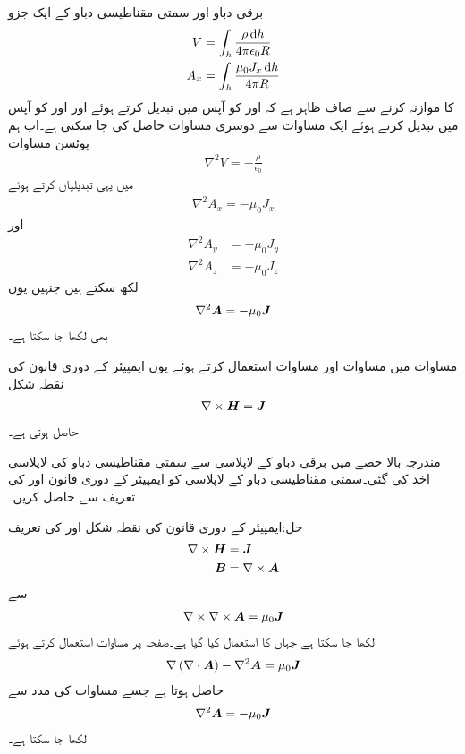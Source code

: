 برقی دباو اور سمتی مقناطیسی دباو کے ایک جزو
\begin{align*}
V&=\int_h \frac{\rho \dif h}{4\pi \epsilon_0 R}\\
A_x&=\int_h \frac{\mu_0 J_x \dif h}{4\pi R}
\end{align*}
 کا موازنہ کرنے سے صاف ظاہر ہے کہ  اور  کو آپس میں تبدیل کرتے ہوئے اور  اور  کو آپس میں تبدیل کرتے ہوئے ایک مساوات سے دوسری مساوات حاصل کی جا سکتی ہے۔اب ہم پوئسن  مساوات
\begin{align*}
\nabla^2 V=-\frac{\rho}{\epsilon_0}
\end{align*} 
میں یہی تبدیلیاں کرتے ہوئے
\begin{align*}
\nabla^2 A_x=-\mu_0 J_x
\end{align*}
اور
\begin{align*}
\nabla^2 A_y&=-\mu_0 J_y\\
\nabla^2 A_z&=-\mu_0 J_z
\end{align*}
لکھ سکتے ہیں جنہیں یوں
\begin{align}\label{مساوات_مقناطیسی_سمتی_مقناطیسی_دباو_کی_لاپلاسی}
\nabla^2 {{\boldsymbol{A}}}=-\mu_0 {{\boldsymbol{J}}}
\end{align}
 بھی لکھا جا سکتا ہے۔

مساوات  میں مساوات  اور مساوات  استعمال کرتے ہوئے یوں ایمپیئر کے دوری قانون کی نقطہ شکل 
\begin{align}
\nabla \times {\ensuremath{{\boldsymbol{H}}}}={{\boldsymbol{J}}}
\end{align}
حاصل ہوتی ہے۔

مندرجہ بالا حصے میں برقی دباو کے لاپلاسی سے سمتی مقناطیسی  دباو کی لاپلاسی اخذ کی گئی۔سمتی مقناطیسی دباو کے لاپلاسی کو ایمپیئر کے دوری قانون اور  کی تعریف سے حاصل کریں۔

حل:ایمپیئر کے دوری قانون کی نقطہ شکل اور  کی تعریف
\begin{align*}
\nabla \times {\ensuremath{{\boldsymbol{H}}}}&={{\boldsymbol{J}}}\\
{{\boldsymbol{B}}}&=\nabla \times {\ensuremath{{\boldsymbol{A}}}}
\end{align*}
سے
\begin{align*}
\nabla \times \nabla \times {\ensuremath{{\boldsymbol{A}}}}=\mu_0 {{\boldsymbol{J}}}
\end{align*}
لکھا جا سکتا ہے جہاں  کا استعمال کیا گیا ہے۔صفحہ  پر مساوات  استعمال کرتے ہوئے
\begin{align*}
\nabla \left(\nabla \cdot {\ensuremath{{\boldsymbol{A}}}} \right)-\nabla^2 {{\boldsymbol{A}}}=\mu_0 {{\boldsymbol{J}}}
\end{align*}
حاصل ہوتا ہے جسے مساوات  کی مدد سے
\begin{align}
\nabla^2 {{\boldsymbol{A}}}=-\mu_0 {{\boldsymbol{J}}}
\end{align}
لکھا جا سکتا ہے۔

